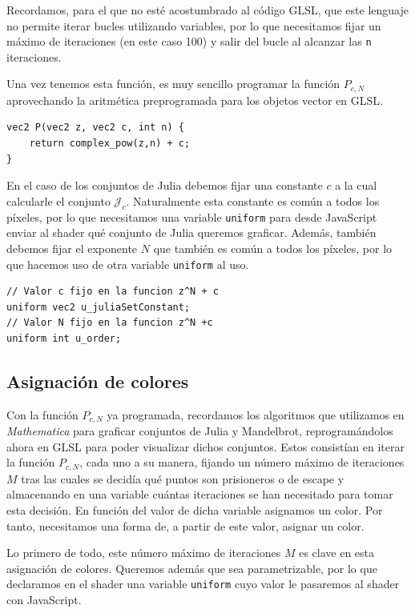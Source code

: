 Recordamos, para el que no esté acostumbrado al código GLSL, que este lenguaje no permite iterar bucles utilizando variables, por lo que necesitamos fijar un máximo de iteraciones (en este caso 100) y salir del bucle al alcanzar las \verb|n| iteraciones.

Una vez tenemos esta función, es muy sencillo programar la función $P_{c,N}$ aprovechando la aritmética preprogramada para los objetos vector en GLSL.

\begin{lstlisting}
vec2 P(vec2 z, vec2 c, int n) {
	return complex_pow(z,n) + c;
}
\end{lstlisting}

En el caso de los conjuntos de Julia debemos fijar una constante $c$ a la cual calcularle el conjunto $\mathcal{J}_c$. Naturalmente esta constante es común a todos los píxeles, por lo que necesitamos una variable \verb|uniform| para desde JavaScript enviar al shader qué conjunto de Julia queremos graficar. Además, también debemos fijar el exponente $N$ que también es común a todos los píxeles, por lo que hacemos uso de otra variable \verb|uniform| al uso.

\begin{lstlisting}
// Valor c fijo en la funcion z^N + c
uniform vec2 u_juliaSetConstant;
// Valor N fijo en la funcion z^N +c
uniform int u_order;
\end{lstlisting}

\subsection{Asignación de colores}
\label{subsection:colores}

Con la función $P_{c,N}$ ya programada, recordamos los algoritmos que utilizamos en \textit{Mathematica} para graficar conjuntos de Julia y Mandelbrot, reprogramándolos ahora en GLSL para poder visualizar dichos conjuntos. Estos consistían en iterar la función $P_{c,N}$, cada uno a su manera, fijando un número máximo de iteraciones $M$ tras las cuales se decidía qué puntos son prisioneros o de escape y almacenando en una variable cuántas iteraciones se han necesitado para tomar esta decisión. En función del valor de dicha variable asignamos un color. Por tanto, necesitamos una forma de, a partir de este valor, asignar un color.

Lo primero de todo, este número máximo de iteraciones $M$ es clave en esta asignación de colores. Queremos además que sea parametrizable, por lo que declaramos en el shader una variable \verb|uniform| cuyo valor le pasaremos al shader con JavaScript.


